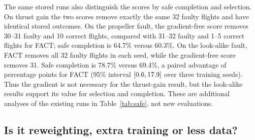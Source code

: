 \documentclass[preprint,12pt]{elsarticle}
\newcommand{\method}{FACT}
\begin{document}
The same stored runs also distinguish the scores by safe completion and selection. On thrust gain the two scores remove exactly the same 32 faulty flights and have identical stored outcomes. On the propeller fault, the gradient-free score removes 30--31 faulty and 10 correct flights, compared with 31--32 faulty and 1--5 correct flights for \method{}; safe completion is 64.7\% versus 60.3\%. On the look-alike fault, \method{} removes all 32 faulty flights in each seed, while the gradient-free score removes 31. Safe completion is 78.7\% versus 69.4\%, a paired advantage of \LookSafeGain{} percentage points for \method{} (95\% interval $[0.6,17.9]$ over three training seeds). Thus the gradient is not necessary for the thrust-gain result, but the look-alike results support its value for selection and completion. These are additional analyses of the existing runs in Table~\ref{tab:safe}, not new evaluations.


\subsection{Is it reweighting, extra training or less data?}\label{sec:reweight}
\end{document}
